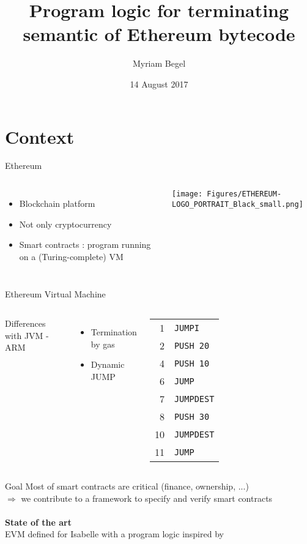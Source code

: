 \documentclass{beamer}
\title{Program logic for terminating semantic of Ethereum bytecode}
\author{Myriam Begel}
\date{14 August 2017}
\begin{document}
\maketitle


\part{Context}
\frame{\partpage}

\begin{frame}{Ethereum}
	\begin{columns}[c]
		\begin{itemize}
			\item Blockchain platform
			\item Not only cryptocurrency
			\item Smart contracts : program running on a (Turing-complete) VM
		\end{itemize}
		\texttt{[image: Figures/ETHEREUM-LOGO\_PORTRAIT\_Black\_small.png]}
	\end{columns}
\end{frame}

\begin{frame}{Ethereum Virtual Machine \footnotesize{\cite{wood2014ethereum}}}
	\begin{columns}[c]
		Differences with JVM - ARM
		\begin{itemize}
			\item Termination by gas
			\item Dynamic JUMP
		\end{itemize}
		\begin{tabular}{r l}
			1 & \texttt{JUMPI} \\
			2 & \texttt{PUSH~20}\\
			4 & \texttt{PUSH~10}\\
			6 & \texttt{JUMP}\\
			7 & \texttt{JUMPDEST}\\
			8 & \texttt{PUSH~30}\\
			10 & \texttt{JUMPDEST}\\
			11 & \texttt{JUMP}
		\end{tabular}
	\end{columns}
\end{frame}

\begin{frame}{Goal}
	Most of smart contracts are critical (finance, ownership, ...)\\
	$\Rightarrow$ we contribute to a framework to specify and verify smart contracts
	\\ ~ \\
	\textbf{State of the art} \\
	EVM defined for Isabelle \cite{hirai2017defining} with a program logic inspired by \cite{Myreen09}
\end{frame}
\end{document}
